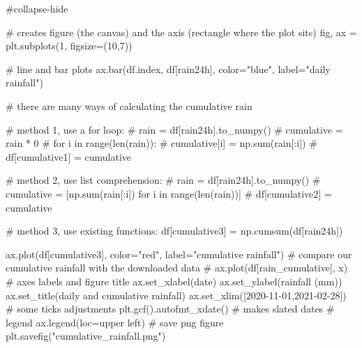 \documentclass[
  letterpaper,
  DIV=11,
  numbers=noendperiod]{scrreprt}
\newenvironment{Shaded}{\begin{snugshade}}{\end{snugshade}}
\newcommand{\CommentTok}[1]{\textcolor[rgb]{0.37,0.37,0.37}{#1}}
\newcommand{\DecValTok}[1]{\textcolor[rgb]{0.68,0.00,0.00}{#1}}
\newcommand{\NormalTok}[1]{\textcolor[rgb]{0.00,0.23,0.31}{#1}}
\newcommand{\OperatorTok}[1]{\textcolor[rgb]{0.37,0.37,0.37}{#1}}
\newcommand{\StringTok}[1]{\textcolor[rgb]{0.13,0.47,0.30}{#1}}
\begin{document}
\begin{Shaded}
\begin{Highlighting}[]
\CommentTok{\#collapse{-}hide}

\CommentTok{\# creates figure (the canvas) and the axis (rectangle where the plot sits)}
\NormalTok{fig, ax }\OperatorTok{=}\NormalTok{ plt.subplots(}\DecValTok{1}\NormalTok{, figsize}\OperatorTok{=}\NormalTok{(}\DecValTok{10}\NormalTok{,}\DecValTok{7}\NormalTok{))}

\CommentTok{\# line and bar plots}
\NormalTok{ax.bar(df.index, df[}\StringTok{\textquotesingle{}rain24h\textquotesingle{}}\NormalTok{], color}\OperatorTok{=}\StringTok{"blue"}\NormalTok{, label}\OperatorTok{=}\StringTok{"daily rainfall"}\NormalTok{)}

\CommentTok{\# there are many ways of calculating the cumulative rain}

\CommentTok{\# method 1, use a for loop:}
\CommentTok{\# rain = df[\textquotesingle{}rain24h\textquotesingle{}].to\_numpy()}
\CommentTok{\# cumulative = rain * 0}
\CommentTok{\# for i in range(len(rain)):}
\CommentTok{\#     cumulative[i] = np.sum(rain[:i])}
\CommentTok{\# df[\textquotesingle{}cumulative1\textquotesingle{}] = cumulative}

\CommentTok{\# method 2, use list comprehension:}
\CommentTok{\# rain = df[\textquotesingle{}rain24h\textquotesingle{}].to\_numpy()}
\CommentTok{\# cumulative = [np.sum(rain[:i]) for i in range(len(rain))]}
\CommentTok{\# df[\textquotesingle{}cumulative2\textquotesingle{}] = cumulative}

\CommentTok{\# method 3, use existing functions:}
\NormalTok{df[}\StringTok{\textquotesingle{}cumulative3\textquotesingle{}}\NormalTok{] }\OperatorTok{=}\NormalTok{ np.cumsum(df[}\StringTok{\textquotesingle{}rain24h\textquotesingle{}}\NormalTok{])}

\NormalTok{ax.plot(df[}\StringTok{\textquotesingle{}cumulative3\textquotesingle{}}\NormalTok{], color}\OperatorTok{=}\StringTok{"red"}\NormalTok{, label}\OperatorTok{=}\StringTok{"cumulative rainfall"}\NormalTok{)}
\CommentTok{\# compare our cumulative rainfall with the downloaded data}
\CommentTok{\# ax.plot(df[\textquotesingle{}rain\_cumulative\textquotesingle{}], \textquotesingle{}x\textquotesingle{})}
\CommentTok{\# axes labels and figure title}
\NormalTok{ax.set\_xlabel(}\StringTok{\textquotesingle{}date\textquotesingle{}}\NormalTok{)}
\NormalTok{ax.set\_ylabel(}\StringTok{\textquotesingle{}rainfall (mm)\textquotesingle{}}\NormalTok{)}
\NormalTok{ax.set\_title(}\StringTok{\textquotesingle{}daily and cumulative rainfall\textquotesingle{}}\NormalTok{)}
\NormalTok{ax.set\_xlim([}\StringTok{\textquotesingle{}2020{-}11{-}01\textquotesingle{}}\NormalTok{,}\StringTok{\textquotesingle{}2021{-}02{-}28\textquotesingle{}}\NormalTok{])}
\CommentTok{\# some ticks adjustments}
\NormalTok{plt.gcf().autofmt\_xdate()  }\CommentTok{\# makes slated dates}
\CommentTok{\# legend}
\NormalTok{ax.legend(loc}\OperatorTok{=}\StringTok{\textquotesingle{}upper left\textquotesingle{}}\NormalTok{)}
\CommentTok{\# save png figure}
\NormalTok{plt.savefig(}\StringTok{"cumulative\_rainfall.png"}\NormalTok{)}
\end{Highlighting}
\end{Shaded}
\end{document}
